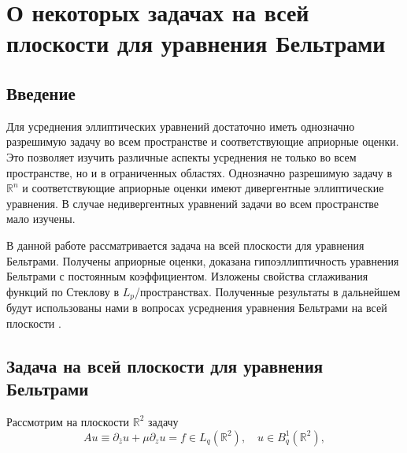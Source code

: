 \chapter{О некоторых задачах на всей плоскости для уравнения Бельтрами}


\section{Введение}
Для усреднения эллиптических уравнений достаточно иметь однозначно разрешимую задачу во всем пространстве и соответствующие априорные оценки. Это позволяет изучить различные  аспекты усреднения не только во всем пространстве, но и в ограниченных областях. Однозначно разрешимую задачу в $\mathbb{R}^n$ и соответствующие априорные оценки имеют дивергентные эллиптические уравнения. В случае недивергентных уравнений задачи во всем пространстве мало изучены. 

В данной работе рассматривается задача на всей плоскости для уравнения Бельтрами. Получены априорные оценки, доказана гипоэллиптичность уравнения Бельтрами с постоянным коэффициентом. Изложены свойства сглаживания функций по Стеклову в $L_p$\-/пространствах. Полученные результаты в дальнейшем будут использованы нами в вопросах усреднения уравнения Бельтрами на всей плоскости .



\section{Задача на всей плоскости для уравнения Бельтрами}
	
Рассмотрим на плоскости $\mathbb{R}^2$ задачу
\begin{equation}\label{eq:smm-1}
  Au\equiv\partial_{\bar{z}}u+\mu\partial_z u=f\in L_q (\mathbb{R}^2),\quad u\in B_q^1 (\mathbb{R}^2),
\end{equation}
                                

